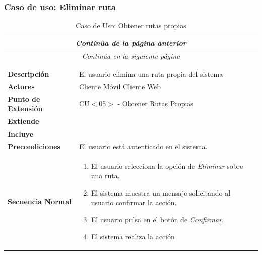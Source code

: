 \newpage
\subsubsection*{Caso de uso: Eliminar ruta}
\begin{longtable}{| p{4cm} | p{10cm} |}
\endfirsthead
\multicolumn{2}{c}{\textit{Continúa de la página anterior}}\\[12pt]
\hline
\endhead
\hline
\multicolumn{2}{c}{\textit{Continúa en la siguiente página}} \\
\endfoot
\hline
\caption{Caso de Uso: Obtener rutas propias}\label{fig:1}\\
\endlastfoot


\hline
\multicolumn{2}{|c|}{\textbf{CU$<$06$>$ - Eliminar Ruta}} \\

\hline
\textbf{Descripción} &
El usuario elimina una ruta propia del sistema\\

\hline
\textbf{Actores} &
Cliente Móvil\newline
Cliente Web\\

\hline
\textbf{Punto de Extensión} &
CU$<$05$>$ - Obtener Rutas Propias
\\

\hline
\textbf{Extiende} &
\\

\hline
\textbf{Incluye} &
\\

\hline
\textbf{Precondiciones} &
El usuario está autenticado en el sistema.\\

\hline
\textbf{Secuencia Normal} &\mbox{}\par\vspace{-\baselineskip}
\begin{enumerate}[leftmargin=0.7cm, topsep=0.1cm]
\item El usuario selecciona la opción de \textit{Eliminar} sobre una ruta.
\item El sistema muestra un mensaje solicitando al usuario confirmar la acción.
\item El usuario pulsa en el botón de \textit{Confirmar}.
\item El sistema realiza la acción
\end{enumerate}\\


\end{longtable}
